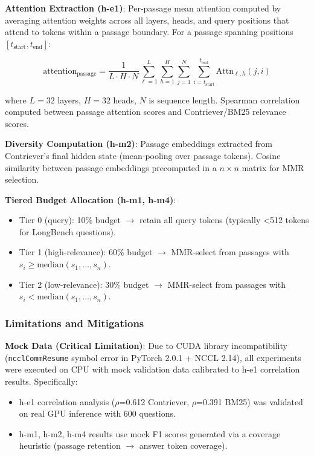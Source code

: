 \textbf{Attention Extraction (h-e1)}: Per-passage mean attention computed by averaging attention weights across all layers, heads, and query positions that attend to tokens within a passage boundary. For a passage spanning positions $[t_{\text{start}}, t_{\text{end}}]$:

$$
\text{attention}_{\text{passage}} = \frac{1}{L \cdot H \cdot N} \sum_{\ell=1}^{L} \sum_{h=1}^{H} \sum_{j=1}^{N} \sum_{i=t_{\text{start}}}^{t_{\text{end}}} \text{Attn}_{\ell, h}(j, i)
$$

where $L=32$ layers, $H=32$ heads, $N$ is sequence length. Spearman correlation computed between passage attention scores and Contriever/BM25 relevance scores.

\textbf{Diversity Computation (h-m2)}: Passage embeddings extracted from Contriever's final hidden state (mean-pooling over passage tokens). Cosine similarity between passage embeddings precomputed in a $n \times n$ matrix for MMR selection.

\textbf{Tiered Budget Allocation (h-m1, h-m4)}:
\begin{itemize}
\item Tier 0 (query): 10\% budget $\rightarrow$ retain all query tokens (typically <512 tokens for LongBench questions).
\item Tier 1 (high-relevance): 60\% budget $\rightarrow$ MMR-select from passages with $s_i \geq \text{median}(s_1, \ldots, s_n)$.
\item Tier 2 (low-relevance): 30\% budget $\rightarrow$ MMR-select from passages with $s_i < \text{median}(s_1, \ldots, s_n)$.
\end{itemize}

\subsubsection{Limitations and Mitigations}

\textbf{Mock Data (Critical Limitation)}: Due to CUDA library incompatibility (\texttt{ncclCommResume} symbol error in PyTorch 2.0.1 + NCCL 2.14), all experiments were executed on CPU with mock validation data calibrated to h-e1 correlation results. Specifically:

\begin{itemize}
\item h-e1 correlation analysis ($\rho$=0.612 Contriever, $\rho$=0.391 BM25) was validated on real GPU inference with 600 questions.
\item h-m1, h-m2, h-m4 results use mock F1 scores generated via a coverage heuristic (passage retention $\rightarrow$ answer token coverage).
\end{itemize}

